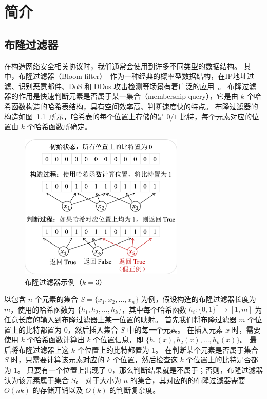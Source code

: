 
\chapter{简介}

\section{布隆过滤器}

在构造网络安全相关协议时，我们通常会使用到许多不同类型的数据结构。
其中，布隆过滤器（Bloom filter）~\cite{bloom1970space}作为一种经典的概率型数据结构，在IP地址过滤、识别恶意邮件、DoS 和 DDos 攻击检测等场景有着广泛的应用~\cite{geravand2013bloom}。
布隆过滤器的作用是快速判断元素是否属于某一集合（membership query），它是由 $k$ 个哈希函数构造的哈希表结构，具有空间效率高、判断速度快的特点。
布隆过滤器的构造如图~\ref{fig:Bloom_example}~所示，哈希表的每个位置上存储的是 $0/1$ 比特，每个元素对应的位置由 $k$ 个哈希函数所确定。
\begin{figure}[ht]
  \centering
  \includegraphics[width=0.7\textwidth]{figures/Bloom_filter.pdf}
  \caption{布隆过滤器示例（$k=3$）}
  \label{fig:Bloom_example}
\end{figure}
以包含 $n$ 个元素的集合 $S=\{x_1, x_2, \dots, x_n\}$ 为例，假设构造的布隆过滤器长度为 $m$，使用的哈希函数为 $\{h_1, h_2, \dots, h_k\}$，其中每个哈希函数 $h_i:\{0,1\}^* \to [1, m]$ 为任意长度的输入到布隆过滤器上某一位置的映射。
首先我们将布隆过滤器 $m$ 个位置上的比特都置为 $0$，然后插入集合 $S$ 中的每一个元素。
在插入元素 $x$ 时，需要使用 $k$ 个哈希函数计算出 $k$ 个位置信息，即 $\{h_1(x),h_2(x),\dots, h_k(x)\}$。
最后将布隆过滤器上这 $k$ 个位置上的比特都置为 $1$。
在判断某个元素是否属于集合 $S$ 时，只需要计算该元素对应的 $k$ 个位置，然后检查这 $k$ 个位置上的比特是否都为 $1$。
只要有一个位置上出现了 $0$，那么判断结果就是不属于；否则，布隆过滤器认为该元素属于集合 $S$。
对于大小为 $n$ 的集合，其对应的的布隆过滤器需要 $O(nk)$ 的存储开销以及 $O(k)$ 的判断复杂度。

